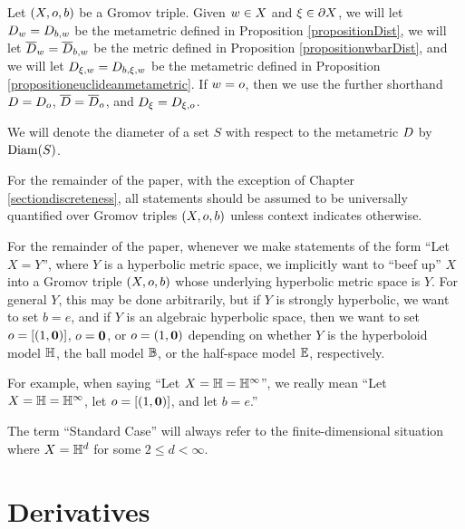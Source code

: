 \begin{notation}
Let $(X,o,b)$ be a Gromov triple. Given $w\in X$ and $\xi\in\partial X$, we will let $D_w = D_{b,w}$ be the metametric defined in Proposition \ref{propositionDist}, we will let $\overline{D}_w = \overline{D}_{b,w}$ be the metric defined in Proposition \ref{propositionwbarDist}, and we will let $D_{\xi,w} = D_{b,\xi,w}$ be the metametric defined in Proposition \ref{propositioneuclideanmetametric}. If $w = o$, then we use the further shorthand $D = D_o$, $\overline{D} = \overline{D}_o$, and $D_\xi = D_{\xi,o}$.

We will denote the diameter of a set $S$ with respect to the metametric $D$ by $\operatorname{Diam}(S)$.
\end{notation}

\begin{convention}
\label{conventiontriples}
For the remainder of the paper, with the exception of Chapter \ref{sectiondiscreteness}, all statements should be assumed to be universally quantified over Gromov triples $(X,o,b)$ unless context indicates otherwise.
\end{convention}

\begin{convention}
For the remainder of the paper, whenever we make statements of the form ``Let $X = Y$'', where $Y$ is a hyperbolic metric space, we implicitly want to ``beef up'' $X$ into a Gromov triple $(X,o,b)$ whose underlying hyperbolic metric space is $Y$. For general $Y$, this may be done arbitrarily, but if $Y$ is strongly hyperbolic, we want to set $b = e$, and if $Y$ is an algebraic hyperbolic space, then we want to set $o = [(1,\mathbf 0)]$, $o = \mathbf 0$, or $o = (1,\mathbf 0)$ depending on whether $Y$ is the hyperboloid model $\H$, the ball model $\B$, or the half-space model $\E$, respectively.

For example, when saying ``Let $X = \H = \H^\infty$'', we really mean ``Let $X = \H = \H^\infty$, let $o = [(1,\mathbf 0)]$, and let $b = e$.''
\end{convention}

\begin{convention}
\label{conventionstandard}
The term ``Standard Case'' will always refer to the finite-dimensional situation where $X = \H^d$ for some $2\leq d < \infty$.
\end{convention}

\bigskip
\section{Derivatives}\label{subsectionderivatives}%

